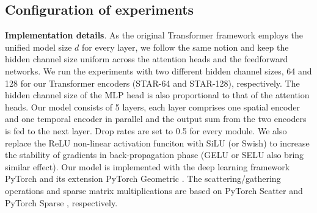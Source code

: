 \documentclass[letterpaper]{article} %
\begin{document}
\subsection{Configuration of experiments}
\textbf{Implementation details}. As the original Transformer framework \cite{attn2017all} employs the unified model size $d$ for every layer, we follow the same notion and keep the hidden channel size uniform across the attention heads and the feedforward networks. We run the experiments with two different hidden channel sizes, 64 and 128 for our Transformer encoders (STAR-64 and STAR-128), respectively. The hidden channel size of the MLP head is also proportional to that of the attention heads. Our model consists of 5 layers, each layer comprises one spatial encoder and one temporal encoder in parallel and the  output sum from the two encoders is fed to the next layer. Drop rates are set to 0.5 for every module. We also replace the ReLU non-linear activation funciton with SiLU (or Swish) \cite{elfwing2018sigmoid, swish2017} to increase the stability of gradients in back-propagation phase (GELU or SELU also bring similar effect). Our model is implemented with the deep learning framework PyTorch \cite{pytorch} and its extension PyTorch Geometric \cite{pytorch_geometric_Fey2019}. The scattering/gathering operations and sparse matrix multiplications are based on PyTorch Scatter \cite{torch_scatter} and PyTorch Sparse \cite{torch_sparse}, respectively.
\end{document}
